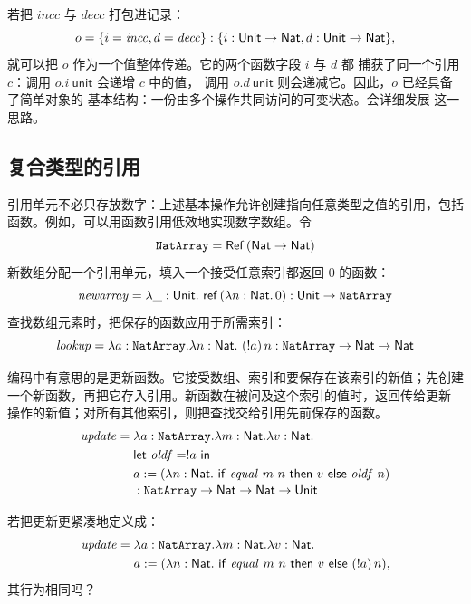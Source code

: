 若把 \(\mathit{incc}\) 与 \(\mathit{decc}\) 打包进记录：
\[
o=\{i=\mathit{incc},d=\mathit{decc}\}
:\{i:\mathsf{Unit}\to\mathsf{Nat},
   d:\mathsf{Unit}\to\mathsf{Nat}\},
\]
就可以把 \(o\) 作为一个值整体传递。它的两个函数字段 \(i\) 与 \(d\) 都
捕获了同一个引用 \(c\)：调用 \(o.i\ \mathsf{unit}\) 会递增 \(c\) 中的值，
调用 \(o.d\ \mathsf{unit}\) 则会递减它。因此，\(o\) 已经具备了简单对象的
基本结构：一份由多个操作共同访问的可变状态。会详细发展
这一思路。

\subsection*{复合类型的引用}

引用单元不必只存放数字：上述基本操作允许创建指向任意类型之值的引用，包括
函数。例如，可以用函数引用低效地实现数字数组。令
\[
\texttt{NatArray}=\mathsf{Ref}\,
(\mathsf{Nat}\to\mathsf{Nat})
\]
新数组分配一个引用单元，填入一个接受任意索引都返回 \(0\) 的函数：
\[
\mathit{newarray}=
\lambda\_:\mathsf{Unit}.\
\mathsf{ref}\,(\lambda n:\mathsf{Nat}.\,0)
:\mathsf{Unit}\to\texttt{NatArray}
\]
查找数组元素时，把保存的函数应用于所需索引：
\[
\mathit{lookup}=
\lambda a:\texttt{NatArray}.\lambda n:\mathsf{Nat}.\
(!a)\,n
:\texttt{NatArray}\to\mathsf{Nat}\to\mathsf{Nat}
\]

编码中有意思的是更新函数。它接受数组、索引和要保存在该索引的新值；先创建
一个新函数，再把它存入引用。新函数在被问及这个索引的值时，返回传给更新
操作的新值；对所有其他索引，则把查找交给引用先前保存的函数。
\[
\begin{aligned}
\mathit{update}={}&
\lambda a:\texttt{NatArray}.\lambda m:\mathsf{Nat}.
\lambda v:\mathsf{Nat}.\\
&\mathsf{let}\ \mathit{oldf}=!a\ \mathsf{in}\\
&a:=(\lambda n:\mathsf{Nat}.\
\mathsf{if}\ \mathit{equal}\ m\ n\
\mathsf{then}\ v\ \mathsf{else}\ \mathit{oldf}\ n)
\\[-2pt]
&:\texttt{NatArray}\to\mathsf{Nat}\to
\mathsf{Nat}\to\mathsf{Unit}
\end{aligned}
\]

\begin{exercise}[\(\star\star\)]
\label{ex:13.1.2}
若把更新更紧凑地定义成：
\[
\begin{aligned}
\mathit{update}={}&
\lambda a:\texttt{NatArray}.\lambda m:\mathsf{Nat}.
\lambda v:\mathsf{Nat}.\\
&a:=(\lambda n:\mathsf{Nat}.\
\mathsf{if}\ \mathit{equal}\ m\ n\
\mathsf{then}\ v\ \mathsf{else}\ (!a)\,n),
\end{aligned}
\]
其行为相同吗？
\end{exercise}

